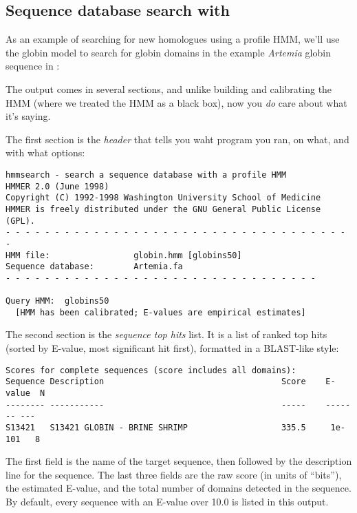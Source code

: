 \subsection{Sequence database search with }

As an example of searching for new homologues using a profile HMM,
we'll use the globin model to search for globin domains in the example
{\em Artemia} globin sequence in :

\vspace{1.5em}

The output comes in several sections, and unlike building and
calibrating the HMM (where we treated the HMM as a black box), now you
{\em do} care about what it's saying.

The first section is the {\em header} that tells you waht program you
ran, on what, and with what options:

{\small\begin{verbatim}
hmmsearch - search a sequence database with a profile HMM
HMMER 2.0 (June 1998)
Copyright (C) 1992-1998 Washington University School of Medicine
HMMER is freely distributed under the GNU General Public License (GPL).
- - - - - - - - - - - - - - - - - - - - - - - - - - - - - - - - - - - -
HMM file:                 globin.hmm [globins50]
Sequence database:        Artemia.fa
- - - - - - - - - - - - - - - - - - - - - - - - - - - - - - - -

Query HMM:  globins50  
  [HMM has been calibrated; E-values are empirical estimates]
\end{verbatim}}

The second section is the {\em sequence top hits} list. It is a list
of ranked top hits (sorted by E-value, most significant hit first),
formatted in a BLAST-like style:

{\small\begin{verbatim}
Scores for complete sequences (score includes all domains):
Sequence Description                                    Score    E-value  N 
-------- -----------                                    -----    ------- ---
S13421   S13421 GLOBIN - BRINE SHRIMP                   335.5     1e-101   8
\end{verbatim}}

The first field is the name of the target sequence, then followed by
the description line for the sequence. The last three fields are the
raw score (in units of ``bits''), the estimated E-value, and the total
number of domains detected in the sequence.  By default, every
sequence with an E-value over 10.0 is listed in this output.


